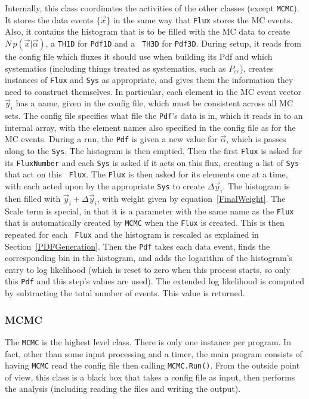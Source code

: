 Internally, this class coordinates the activities of the other classes
(except {\tt MCMC}).  It stores the data events $\{\vec{x}\}$ in the
same way that {\tt Flux} stores the MC events.  Also, it contains the
histogram that is to be filled with the MC data to create
$N\,p(\vec{x}|\vec{\alpha})$, a {\tt TH1D} for {\tt Pdf1D} and a {\tt
TH3D} for {\tt Pdf3D}.  During setup, it reads from the config file
which fluxes it should use when building its Pdf and which systematics
(including things treated as systematics, such as $P_{ee}$), creates
instances of {\tt Flux} and {\tt Sys} as appropriate, and gives them
the information they need to construct themselves.  In particular,
each element in the MC event vector $\vec{y}_i$ has a name, given in
the config file, which must be consistent across all MC sets.  The
config file specifies what file the {\tt Pdf}'s data is in, which it
reads in to an internal array, with the element names also specified
in the config file as for the MC events.  During a run, the {\tt Pdf}
is given a new value for $\vec{\alpha}$, which is passes along to the
{\tt Sys}.  The histogram is then emptied.  Then the first {\tt Flux}
is asked for its {\tt FluxNumber} and each {\tt Sys} is asked if it
acts on this flux, creating a list of {\tt Sys} that act on this {\tt
Flux}.  The {\tt Flux} is then asked for its elements one at a time,
with each acted upon by the appropriate {\tt Sys} to create $\Delta
\vec{y}_i$.  The histogram is then filled with $\vec{y}_i + \Delta
\vec{y}_i$, with weight given by \mbox{equation \ref{FinalWeight}}.
The Scale term is special, in that it is a parameter with the same
name as the {\tt Flux} that is automatically created by {\tt MCMC}
when the {\tt Flux} is created.  This is then repeated for each {\tt
Flux} and the histogram is rescaled as explained in \mbox{Section
\ref{PDFGeneration}}.  Then the {\tt Pdf} takes each data event, finds
the corresponding bin in the histogram, and adds the logarithm of the
histogram's entry to log likelihood (which is reset to zero when this
process starts, so only this {\tt Pdf} and this step's values are
used).  The extended log likelihood is computed by subtracting the
total number of events.  This value is returned.

\subsubsection{MCMC}
The {\tt MCMC} is the highest level class.  There is only one instance
per program.  In fact, other than some input processing and a timer,
the main program consists of having {\tt MCMC} read the config file
then calling {\tt MCMC.Run()}.  From the outside point of view, this
class is a black box that takes a config file as input, then performs
the analysis (including reading the files and writing the output).

